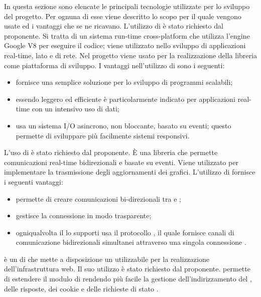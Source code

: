 In questa sezione sono elencate le principali tecnologie utilizzate per lo sviluppo del progetto. Per ognuna di esse viene descritto lo scopo per il quale vengono usate ed i vantaggi che se ne ricavano.
L'utilizzo di  è stato richiesto dal proponente. Si tratta di un sistema run-time cross-platform che utilizza l'engine Google V8  per eseguire il codice; viene utilizzato nello sviluppo di applicazioni real-time, lato  e di rete. Nel progetto viene usato per la realizzazione della libreria come piattaforma di sviluppo.
I vantaggi nell'utilizzo di  sono i seguenti:
\begin{itemize}
\item fornisce una semplice soluzione per lo sviluppo di programmi scalabili;
\item essendo leggero ed efficiente è particolarmente indicato per applicazioni real-time con un intensivo uso di dati;
\item usa un sistema I/O asincrono, non bloccante, basato su eventi; questo permette di sviluppare più facilmente sistemi responsivi.
\end{itemize}

L'uso di  è stato richiesto dal proponente. È una libreria  che permette comunicazioni real-time bidirezionali e basate su eventi. Viene utilizzato per implementare la trasmissione degli aggiornamenti dei grafici.
L'utilizzo di  fornisce i seguenti vantaggi:
\begin{itemize}
\item permette di creare comunicazioni bi-direzionali tra  e ;
\item gestisce la connessione in modo trasparente;
\item ogniqualvolta il  lo supporti usa il protocollo , il quale fornisce canali di comunicazione bidirezionali simultanei attraverso una singola connessione .
\end{itemize}

 è un  di  che mette a disposizione un  utilizzabile per la realizzazione dell'infrastruttura web. Il suo utilizzo è stato richiesto dal proponente.
 permette di estendere il modulo \texttt{} di  rendendo più facile la gestione dell'indirizzamento del , delle risposte, dei cookie e delle richieste di stato .

